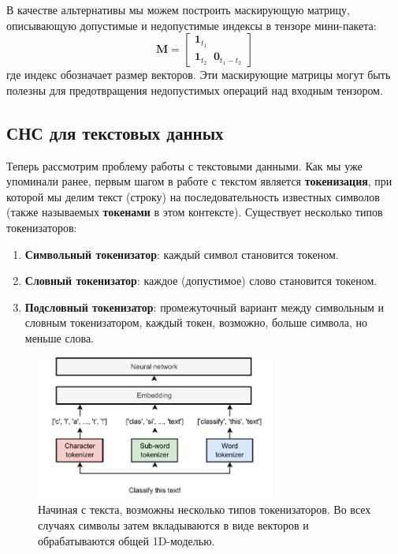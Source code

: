 В качестве альтернативы мы можем построить маскирующую матрицу, описывающую допустимые и недопустимые индексы в тензоре мини-пакета:
%
$$
\mathbf{M}=\begin{bmatrix} \mathbf{1}_{t_1} \\ \mathbf{1}_{t_2} \;\;\mathbf{0}_{t_1-t_2} \end{bmatrix}
$$
%
где индекс обозначает размер векторов. Эти маскирующие матрицы могут быть полезны для предотвращения недопустимых операций над входным тензором.

\subsection{СНС для текстовых данных}

Теперь рассмотрим проблему работы с текстовыми данными. Как мы уже упоминали ранее, первым шагом в работе с текстом является \textbf{токенизация}, при которой мы делим текст (строку) на последовательность известных символов (также называемых \textbf{токенами} в этом контексте). Существует несколько типов токенизаторов:
%
\begin{enumerate}
\item \textbf{Символьный токенизатор}: каждый символ становится токеном.
\item \textbf{Словный токенизатор}: каждое (допустимое) слово становится токеном.
\item \textbf{Подсловный токенизатор}: промежуточный вариант между символьным и словным токенизатором, каждый токен, возможно, больше символа, но меньше слова.
\end{enumerate}

\begin{figure}
    \centering
    \includegraphics[width=0.7\textwidth]{images/text_tokenization}
    \caption{Начиная с текста, возможны несколько типов токенизаторов. Во всех случаях символы затем вкладываются в виде векторов и обрабатываются общей 1D-моделью.}
    \label{fig:text_tokenization}
\end{figure}


